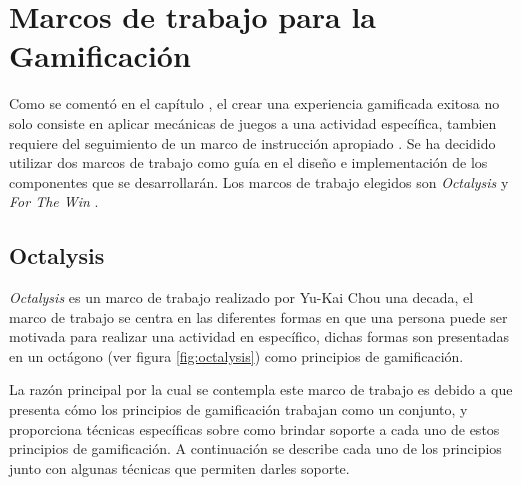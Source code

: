 \section{Marcos de trabajo para la Gamificación}

 Como se comentó en el capítulo , el crear una experiencia
 gamificada exitosa no solo consiste en aplicar mecánicas de juegos a una actividad
 específica, tambien requiere del seguimiento de un marco de instrucción apropiado \cite[p. 1110]{GamInE-Learning}.
 Se ha decidido utilizar dos marcos de trabajo como guía en el diseño e implementación
 de los componentes que se desarrollarán. Los marcos de trabajo elegidos son {\it Octalysis}
 \cite{Octalysis} y {\it For The Win} \cite{FrameWorkForTheWin}.

\subsection{Octalysis}
\label{sec:octalysis}

 {\it Octalysis} es un marco de trabajo realizado por Yu-Kai Chou una decada, el marco de
 trabajo se centra en las diferentes formas en que una persona puede ser motivada para
 realizar una actividad en específico, dichas formas son presentadas en un octágono
 (ver figura \ref{fig:octalysis}) como principios de gamificación.\\
 
    

 \noindent La razón principal por la cual se contempla este marco de trabajo es debido a que presenta
 cómo los principios de gamificación trabajan como un conjunto, y proporciona técnicas específicas
 sobre como brindar soporte a cada uno de estos principios de gamificación. A continuación se
 describe cada uno de los principios junto con algunas técnicas que permiten darles soporte.
    
\subsubsection{\principioI} \label{subsec:principioI}
  
